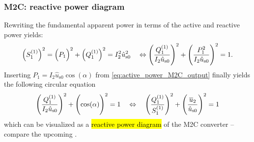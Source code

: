 \begin{frame}[c]
    \frametitle{M2C: reactive power diagram}
    Rewriting the fundamental apparent power in terms of the active and reactive power yields:
    \begin{equation}
        \left(S_1^{(1)}\right)^2 = \left(P_1\vphantom{Q_1^{(1)}}\right)^2 + \left(Q_1^{(1)}\right)^2 = I_2^2 \hat{u}^2_\mathrm{s0}  \quad \Leftrightarrow \left(\frac{Q_1^{(1)}}{I_2 \hat{u}_\mathrm{s0}}\right)^2 + \left(\frac{P_1^2}{I_2 \hat{u}_\mathrm{s0}}\vphantom{\frac{Q_1^{(1)}}{I_2 \hat{u}_\mathrm{s0}}}\right)^2 = 1.
    \end{equation}
    Inserting $P_1 = I_2 \hat{u}_\mathrm{s0} \cos(\alpha)$ from \eqref{eq:active_power_M2C_output} finally yields the following circular equation
    \begin{equation}
        \left(\frac{Q_1^{(1)}}{I_2 \hat{u}_\mathrm{s0}}\right)^2 + \left(\cos(\alpha)\vphantom{\frac{Q_1^{(1)}}{I_2 \hat{u}_\mathrm{s0}}}\right)^2 = 1 \quad \Leftrightarrow \quad \left(\frac{Q_1^{(1)}}{S_1^{(1)}}\right)^2 + \left(\frac{\overline{u}_2}{\hat{u}_\mathrm{s0}}\vphantom{\frac{Q_1^{(1)}}{S_1^{(1)}}}\right)^2 = 1 
    \end{equation}
    which can be visualized as a \hl{reactive power diagram} of the M2C converter -- compare the upcoming .
\end{frame}

